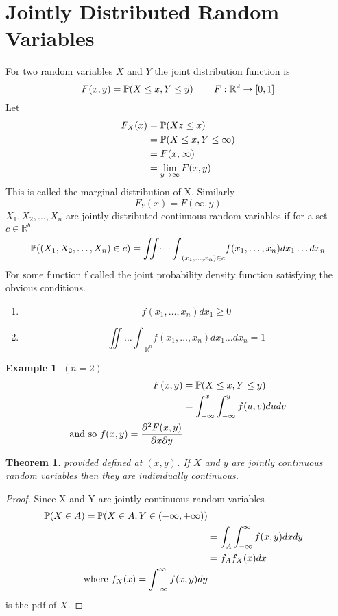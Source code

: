 \documentclass{notes}
\theoremstyle{plain}
\newtheorem{theorem}{Theorem}[chapter]
\newtheorem*{example}{Example}
\newcommand{\bP}{\mathbb{P}}
\newcommand{\bR}{\mathbb{R}}
\newcommand{\prob}[1]{\bP \negthinspace\left(#1\right)}
\begin{document}
\section{Jointly Distributed Random Variables}
For two random variables $X$ and $Y$ the joint distribution function
is
\[
F(x,y) = \prob{X \leq x, Y \leq y} \qquad F: \bR^2 \to[0,1]
\]
Let
\begin{align*}
F_X(x)&= \prob{X z\leq x}\\
&= \prob{X \leq x, Y \leq \infty}\\
&=F(x,\infty) \\
&=\lim_{y\to\infty} F(x,y)
\end{align*}
This is called the marginal distribution of X. Similarly
\[
F_Y(x)=F(\infty,y)
\]
$X_1,X_2,\dots,X_n$ are jointly distributed continuous random
variables if for a set $c\in \bR^b$
\[
\prob{(X_1,X_2,\dots,X_n)\in c} = {\iint\dots\int}_{(x_1,\dots,x_n) \in c}
f(x_1,\dots,x_n)dx_1\dots dx_n
\]
For some function f called the joint probability density function
satisfying the obvious conditions.
\begin{enumerate}
\item
\[
f(x_1,\dots,x_n)dx_1 \geq 0
\]
\item 
\[
{\iint\dots\int}_{\bR^n} f(x_1,\dots,x_n)dx_1\dots dx_n = 1
\]
\end{enumerate}
\begin{example} $(n=2)$
\begin{align*}
F(x,y) &= \prob{X\leq x, Y\leq y}\\
&=\int_{-\infty}^{x}\int_{-\infty}^{y} f(u,v) du dv\\
\text{and so }
 f(x,y) = \frac{\partial^2 F(x,y)}{\partial x \partial y}
\end{align*}
\end{example}
\begin{theorem}
provided defined at $(x,y)$. If $X$ and $y$ are jointly continuous
random variables then they are individually continuous.
\end{theorem}
\begin{proof} Since X and Y are
  jointly continuous random variables
\begin{align*}
\prob{X\in A} = \prob{X\in A,Y\in (-\infty, +\infty)}\\
&= \int_A\int_{-\infty}^{\infty} f(x,y)dxdy \\
&=f_Af_X(x)dx\\
\text{where } f_X(x) = \int_{-\infty}^{\infty}f(x,y) dy
\end{align*}
is the pdf of $X$.
\end{proof}
\end{document}
